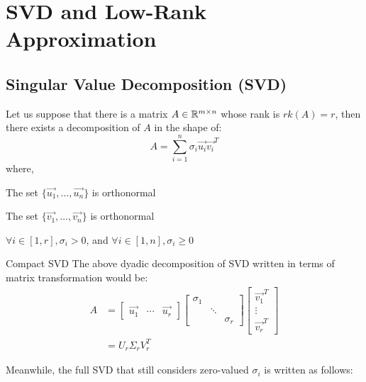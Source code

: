 \chapter{SVD and Low-Rank Approximation}

\section{Singular Value Decomposition (SVD)}
Let us suppose that there is a matrix $A \in \mathbb{R}^{m \times n}$ whose rank is $rk(A) = r$, then there exists a decomposition of $A$ in the shape of:
\[
    A = \sum_{i = 1}^n \sigma_i \vec{u_i} \vec{v_i}^T
\]
where,
\begin{bindenum}
    \item The set $\{\vec{u_1}, \dots, \vec{u_n}\}$ is orthonormal
    \item The set $\{\vec{v_1}, \dots, \vec{v_n}\}$ is orthonormal
    \item $\forall i \in [1, r], \sigma_i > 0$, and $\forall i \in [1, n], \sigma_i \geq 0$
\end{bindenum}
\begin{ln-symbol}{Compact SVD}{}
    The above dyadic decomposition of SVD written in terms of matrix transformation would be:
    \begin{align*}
        A &=
        \begin{bmatrix} \vec{u_1} & \cdots & \vec{u_r} \end{bmatrix}
        \begin{bmatrix}
            \sigma_1 & & \\
            & \ddots & \\
            & & \sigma_r
        \end{bmatrix}
        \begin{bmatrix} \vec{v_1}^T \\ \vdots \\ \vec{v_r}^T \end{bmatrix} \\
        &= U_r \Sigma_r V_r^T
    \end{align*}
\end{ln-symbol}
Meanwhile, the full SVD that still considers zero-valued $\sigma_i$ is written as follows:
